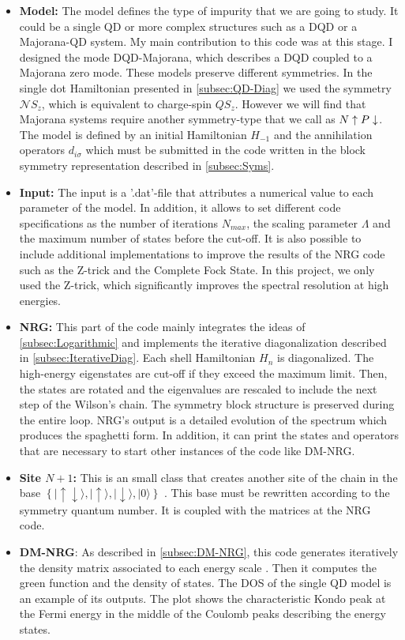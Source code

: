 \begin{itemize}
\item \textbf{Model:} The model defines the type of impurity that we are going to study. It could be a single QD or more complex structures such as a DQD or a Majorana-QD system. My main contribution to this code was at this stage. I designed the mode DQD-Majorana, which describes a DQD coupled to a Majorana zero mode. These models preserve different symmetries. In the single dot Hamiltonian presented in \ref{subsec:QD-Diag} we used the symmetry $\mathcal{N}S_z$, which is equivalent to charge-spin $QS_z$. However we will find that Majorana systems  require another  symmetry-type that we call as $N\uparrow P\downarrow$. The model is defined by an initial Hamiltonian $H_{-1}$ and the annihilation operators $d_{i\sigma}$ which must be submitted in the code written in the block symmetry representation described in \ref{subsec:Syms}.
\item \textbf{Input:} The input is a '.dat'-file that attributes a numerical value to each parameter of the model. In addition, it allows to set different code specifications as the number of iterations $N_{max}$, the scaling parameter $\Lambda$ and the maximum number of states before the cut-off. It is also possible to include additional implementations to improve the results of the NRG code such as the Z-trick \cite{oliveira_generalized_1994} and the Complete Fock State. In this project, we only used the Z-trick, which significantly improves the spectral resolution at high energies.
\item \textbf{NRG:} This part of the code mainly integrates the ideas of \ref{subsec:Logarithmic} and implements the iterative diagonalization described in \ref{subsec:IterativeDiag}. Each shell Hamiltonian $H_n$ is diagonalized. The high-energy eigenstates are cut-off if they exceed the maximum limit. Then, the states are rotated and the eigenvalues are rescaled to include the next step of the Wilson's chain. The symmetry block structure is preserved during the entire loop. NRG's output is a detailed evolution of the spectrum which produces the spaghetti form. In addition, it can print the states and operators that are necessary to start other instances of the code like DM-NRG.
\item \textbf{Site $N+1$:} This is an small class that creates another site of the chain in the base $\left\{ \vert\uparrow\!\downarrow\rangle,\vert\uparrow\rangle,\vert\downarrow\rangle,\vert0\rangle\right\} $ . This base must be rewritten according to the symmetry quantum number. It is coupled with the matrices at the NRG code. 
\item \textbf{DM-NRG}: As described in \ref{subsec:DM-NRG}, this code generates iteratively the density matrix associated to each energy scale . Then it computes the green function and the density of states. The DOS of the single QD model is an example of its outputs. The plot shows the characteristic Kondo peak at the Fermi energy in the middle of the Coulomb peaks describing the energy states. 
\end{itemize}


